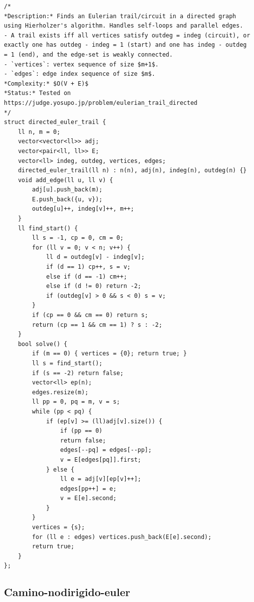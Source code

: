 \documentclass[10pt,a4paper,twocolumn]{article}
\begin{document}
\begin{lstlisting}[style=cpp, title={CaminoDirigidoEuler.cpp}]
/*
*Description:* Finds an Eulerian trail/circuit in a directed graph using Hierholzer's algorithm. Handles self-loops and parallel edges.
- A trail exists iff all vertices satisfy outdeg = indeg (circuit), or exactly one has outdeg - indeg = 1 (start) and one has indeg - outdeg = 1 (end), and the edge-set is weakly connected.
- `vertices`: vertex sequence of size $m+1$.
- `edges`: edge index sequence of size $m$.
*Complexity:* $O(V + E)$
*Status:* Tested on https://judge.yosupo.jp/problem/eulerian_trail_directed
*/
struct directed_euler_trail {
	ll n, m = 0;
	vector<vector<ll>> adj;
	vector<pair<ll, ll>> E;
	vector<ll> indeg, outdeg, vertices, edges;
	directed_euler_trail(ll n) : n(n), adj(n), indeg(n), outdeg(n) {}
	void add_edge(ll u, ll v) {
		adj[u].push_back(m);
		E.push_back({u, v});
		outdeg[u]++, indeg[v]++, m++;
	}
	ll find_start() {
		ll s = -1, cp = 0, cm = 0;
		for (ll v = 0; v < n; v++) {
			ll d = outdeg[v] - indeg[v];
			if (d == 1) cp++, s = v;
			else if (d == -1) cm++;
			else if (d != 0) return -2;
			if (outdeg[v] > 0 && s < 0) s = v;
		}
		if (cp == 0 && cm == 0) return s;
		return (cp == 1 && cm == 1) ? s : -2;
	}
	bool solve() {
		if (m == 0) { vertices = {0}; return true; }
		ll s = find_start();
		if (s == -2) return false;
		vector<ll> ep(n);
		edges.resize(m);
		ll pp = 0, pq = m, v = s;
		while (pp < pq) {
			if (ep[v] >= (ll)adj[v].size()) {
				if (pp == 0)
				return false;
				edges[--pq] = edges[--pp];
				v = E[edges[pq]].first;
			} else {
				ll e = adj[v][ep[v]++];
				edges[pp++] = e;
				v = E[e].second;
			}
		}
		vertices = {s};
		for (ll e : edges) vertices.push_back(E[e].second);
		return true;
	}
};
\end{lstlisting}

\subsection{Camino-nodirigido-euler}
\end{document}
